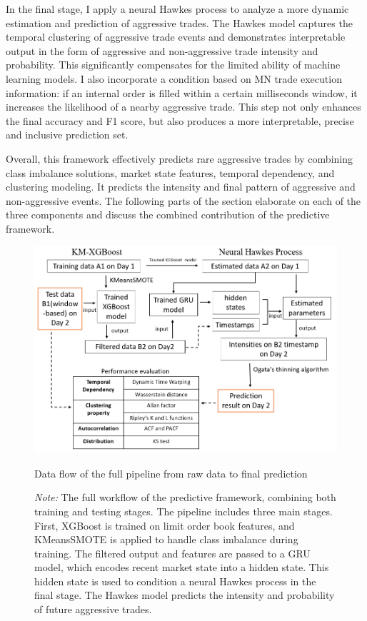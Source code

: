 In the final stage, I apply a neural Hawkes process to analyze a more dynamic estimation and prediction of aggressive trades. The Hawkes model captures the temporal clustering of aggressive trade events and demonstrates interpretable output in the form of aggressive and non-aggressive trade intensity and probability. This significantly compensates for the limited ability of machine learning models. I also incorporate a condition based on MN trade execution information: if an internal order is filled within a certain milliseconds window, it increases the likelihood of a nearby aggressive trade. This step not only enhances the final accuracy and F1 score, but also produces a more interpretable, precise and inclusive prediction set.

Overall, this framework effectively predicts rare aggressive trades by combining class imbalance solutions, market state features, temporal dependency, and clustering modeling. It predicts the intensity and final pattern of aggressive and non-aggressive events. The following parts of the section elaborate on each of the three components and discuss the combined contribution of the predictive framework.

\begin{figure}[h]
    \centering
    \includegraphics[width=\textwidth]{figures/data_flow1.png}
    \caption{Data flow of the full pipeline from raw data to final prediction}
    \caption*{\textit{Note:} The full workflow of the predictive framework, combining both training and testing stages. The pipeline includes three main stages. First, XGBoost is trained on limit order book features, and KMeansSMOTE is applied to handle class imbalance during training. The filtered output and features are passed to a GRU model, which encodes recent market state into a hidden state. This hidden state is used to condition a neural Hawkes process in the final stage. The Hawkes model predicts the intensity and probability of future aggressive trades.}
    \label{fig:data-flow-diagram}
\end{figure}


